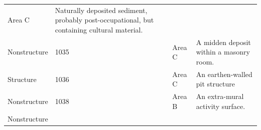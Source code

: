 \documentclass[
  12pt,
]{krantz}
\begin{document}
\begin{longtable}[]{@{}llll@{}}
\begin{minipage}[t]{0.16\columnwidth}
Area C\strut
\end{minipage} & \begin{minipage}[t]{0.38\columnwidth}\raggedright
Naturally deposited
sediment, probably
post-occupational, but
containing cultural
material.\strut
\end{minipage}\tabularnewline
\begin{minipage}[t]{0.18\columnwidth}\raggedright
Nonstructure\strut
\end{minipage} & \begin{minipage}[t]{0.11\columnwidth}\raggedright
1035\strut
\end{minipage} & \begin{minipage}[t]{0.16\columnwidth}\raggedright
Area C\strut
\end{minipage} & \begin{minipage}[t]{0.38\columnwidth}\raggedright
A midden deposit within a
masonry room.\strut
\end{minipage}\tabularnewline
\begin{minipage}[t]{0.18\columnwidth}\raggedright
Structure\strut
\end{minipage} & \begin{minipage}[t]{0.11\columnwidth}\raggedright
1036\strut
\end{minipage} & \begin{minipage}[t]{0.16\columnwidth}\raggedright
Area C\strut
\end{minipage} & \begin{minipage}[t]{0.38\columnwidth}\raggedright
An earthen-walled pit
structure\strut
\end{minipage}\tabularnewline
\begin{minipage}[t]{0.18\columnwidth}\raggedright
Nonstructure\strut
\end{minipage} & \begin{minipage}[t]{0.11\columnwidth}\raggedright
1038\strut
\end{minipage} & \begin{minipage}[t]{0.16\columnwidth}\raggedright
Area B\strut
\end{minipage} & \begin{minipage}[t]{0.38\columnwidth}\raggedright
An extra-mural activity
surface.\strut
\end{minipage}\tabularnewline
\begin{minipage}[t]{0.18\columnwidth}\raggedright
Nonstructure\strut
\end{minipage} & \begin{minipage}[t]{0.11\columnwidth}\raggedright

\end{minipage}
\end{longtable}
\end{document}
